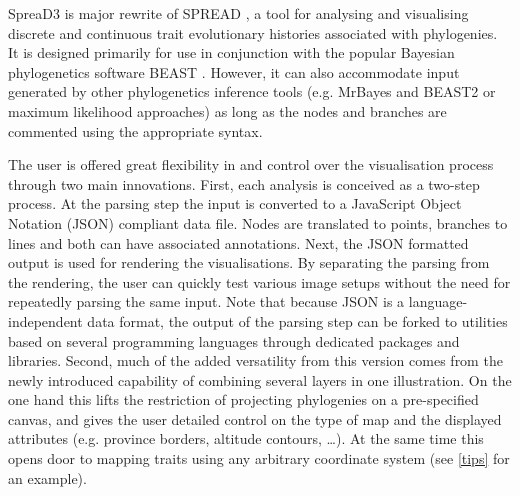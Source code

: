 \documentclass[english]{paper}
\begin{document}

SpreaD3 is major rewrite of SPREAD \citep{bielejec11}, a tool for analysing and visualising discrete and continuous trait evolutionary histories associated with phylogenies.
It is designed primarily for use in conjunction with the popular Bayesian phylogenetics software BEAST \citep{drummond:2012zr}.
However, it can also accommodate input generated by other phylogenetics inference tools (e.g. MrBayes and BEAST2 or maximum likelihood approaches) as long as the nodes and branches are commented using the appropriate syntax.
\par
The user is offered great flexibility in and control over the visualisation process through two main innovations.
First, each analysis is conceived as a two-step process. 
At the parsing step the input is converted to a JavaScript Object Notation (JSON) compliant data file.
Nodes are translated to points, branches to lines and both can have associated annotations. 
Next, the JSON formatted output is used for rendering the visualisations.
By separating the parsing from the rendering, the user can quickly test various image setups without the need for repeatedly parsing the same input.
Note that because JSON is a language-independent data format, the output of the parsing step can be forked to utilities based on several programming languages through dedicated packages and libraries. %
Second, much of the added versatility from this version comes from the newly introduced capability of combining several layers in one illustration. %
On the one hand this lifts the restriction of projecting phylogenies on a pre-specified canvas, and gives the user detailed control on the type of map and the displayed %
attributes (e.g. province borders, altitude contours, \dots). %
At the same time this opens door to mapping traits using any arbitrary coordinate system (see \ref{tips} for an example). 
\end{document}
